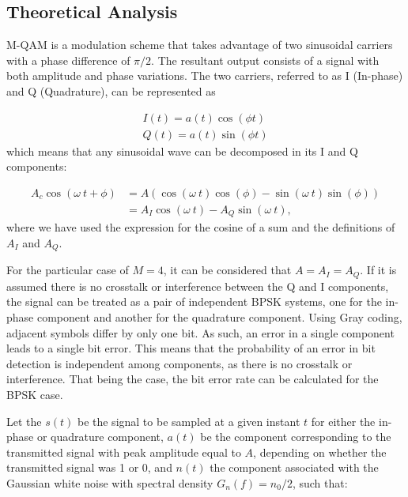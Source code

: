 \begin{refsection}

\subsection{Theoretical Analysis}

M-QAM is a modulation scheme that takes advantage of two sinusoidal carriers with a phase difference of $\pi/2$. The resultant output consists of a signal with both amplitude and phase variations. The two carriers, referred to as I (In-phase) and Q (Quadrature), can be represented as

\begin{align}
	I(t)=a(t)\cos(\phi t) \\
	Q(t)=a(t)\sin(\phi t)
\end{align}
which means that any sinusoidal wave can be decomposed in its I and Q components:

\begin{align}
	A_c\cos(\omega~t+\phi)&=A\left(\cos(\omega~t)\cos(\phi)-\sin(\omega~t)\sin(\phi)\right) \\
	&=A_I\cos(\omega~t)-A_Q\sin(\omega~t),
\end{align}
where we have used the expression for the cosine of a sum and the definitions of $A_I$ and $A_Q$.



For the particular case of $M=4$, it can be considered that $A=A_I=A_Q$. If it is assumed there is no crosstalk or interference between the Q and I components, the signal can be treated as a pair of independent BPSK systems, one for the in-phase component and another for the quadrature component.
Using Gray coding, adjacent symbols differ by only one bit. As such, an error in a single component leads to a single bit error.
This means that the probability of an error in bit detection is independent among components, as there is no crosstalk or interference. That being the case, the bit error rate can be calculated for the BPSK case.


Let the $s(t)$ be the signal to be sampled at a given instant $t$ for either the in-phase or quadrature component, $a(t)$ be the component corresponding to the transmitted signal with peak amplitude equal to $A$, depending on whether the transmitted signal was 1 or 0, and $n(t)$ the component associated with the Gaussian white noise with spectral density $G_n(f) = n_0/2$, such that:


\end{refsection}
